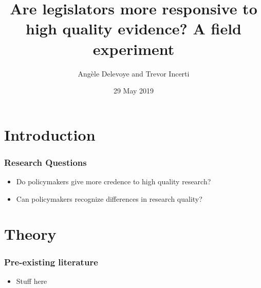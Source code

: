 \documentclass[usenames,dvipsnames]{beamer}
\title{Are legislators more responsive to high quality evidence? A field experiment}
\author{Angèle Delevoye and Trevor Incerti}
\date{29 May 2019}
\begin{document}
\maketitle


\section{Introduction}

\begin{frame}
\frametitle{Research Questions}
\begin{itemize}
\item Do policymakers \textcolor{Cerulean}{give more credence} to high quality research?
\vspace{15mm}
\pause
\item Can policymakers \textcolor{Cerulean}{recognize} differences in research quality?
\end{itemize}
\end{frame}



\section{Theory}

\begin{frame}
\frametitle{Pre-existing literature}

\begin{itemize}
\item Stuff here
\end{itemize}

\end{frame}

\end{document}
